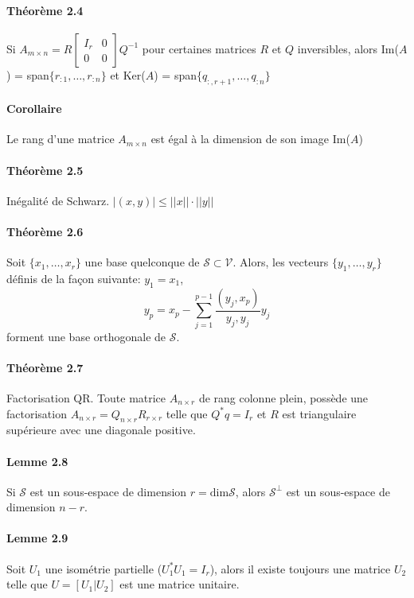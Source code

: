 \paragraph{Théorème 2.4} Si $A_{m\times n} = R \begin{bmatrix}
I_r & 0 \\
0 & 0
\end{bmatrix} Q^{-1}$ pour certaines matrices $R$ et $Q$ inversibles, alors Im($A$) = span$\{r_{:1},\dots,r_{:n}\}$ et Ker($A$) = span$\{q_{:,r+1},\dots,q_{:n}\}$

\paragraph{Corollaire} Le rang d'une matrice $A_{m\times n}$ est égal à la dimension de son image Im($A$)

\paragraph{Théorème 2.5} Inégalité de Schwarz. $|(x,y)| \leq ||x||\cdot ||y||$

\paragraph{Théorème 2.6} Soit $\{x_1,\dots,x_r\}$ une base quelconque de $\mathcal{S} \subset \mathcal{V}$. Alors, les vecteurs $\{y_1,\dots,y_r\}$ définis de la façon suivante: $y_1 = x_1$,
$$ y_p = x_p - \sum_{j = 1}^{p-1} \frac{(y_j,x_p)}{y_j,y_j} y_j$$
forment une base orthogonale de $\mathcal{S}$.

\paragraph{Théorème 2.7} Factorisation QR. Toute matrice $A_{n\times r}$ de rang colonne plein, possède une factorisation $A_{n\times r} = Q_{n\times r} R_{r\times r}$ telle que $Q^* q = I_r$ et $R$ est triangulaire supérieure avec une diagonale positive.

\paragraph{Lemme 2.8} Si $\mathcal{S}$ est un sous-espace de dimension $r= \text{dim} \mathcal{S}$, alors $\mathcal{S}^\perp$ est un sous-espace de dimension $n-r$.

\paragraph{Lemme 2.9} Soit $U_1$ une isométrie partielle ($U_1^* U_1 = I_r$), alors il existe toujours une matrice $U_2$ telle que $U = [U_1|U_2]$ est une matrice unitaire.

